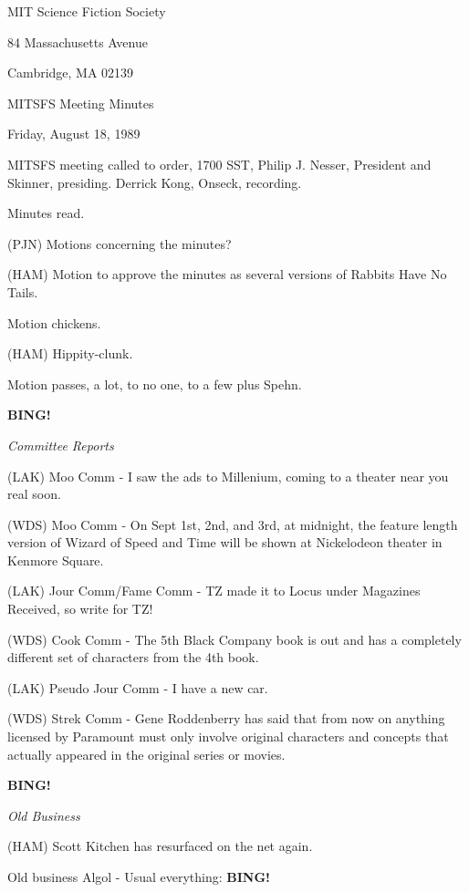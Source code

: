 \documentclass[12pt]{article}
\newcommand{\bing}{{\bf BING!} }
\newcommand{\goto}[1]{\bing \vskip 12pt \centerline{{\em{#1}}}}
\begin{document}
\begin{center}

MIT Science Fiction Society 

84 Massachusetts Avenue

Cambridge, MA 02139

\vspace{12pt}

MITSFS Meeting Minutes 

Friday, August 18, 1989

\end{center}
 
\vspace{18pt}

\setlength{\parskip}{6pt}

\noindent
MITSFS meeting called to order, 1700 SST, Philip J. Nesser, President and Skinner, presiding. Derrick Kong, Onseck, recording.

Minutes read.

(PJN) Motions concerning the minutes?

(HAM) Motion to approve the minutes as several versions of Rabbits Have No Tails.

Motion chickens.

(HAM) Hippity-clunk.

Motion passes, a lot, to no one, to a few plus Spehn.

\goto{Committee Reports}

(LAK) Moo Comm - I saw the ads to Millenium, coming to a theater near you real soon.

(WDS) Moo Comm - On Sept 1st, 2nd, and 3rd, at midnight, the feature length version of Wizard of Speed and Time will be shown at Nickelodeon theater in Kenmore Square.

(LAK) Jour Comm/Fame Comm - TZ made it to Locus under Magazines Received, so write for TZ!

(WDS) Cook Comm - The 5th Black Company book is out and has a completely different set of characters from the 4th book.

(LAK) Pseudo Jour Comm - I have a new car.

(WDS) Strek Comm - Gene Roddenberry has said that from now on anything licensed by Paramount must only involve original characters and concepts that actually appeared in the original series or movies.

\goto{Old Business}

(HAM) Scott Kitchen has resurfaced on the net again.

Old business Algol - Usual everything: \bing
\end{document}
